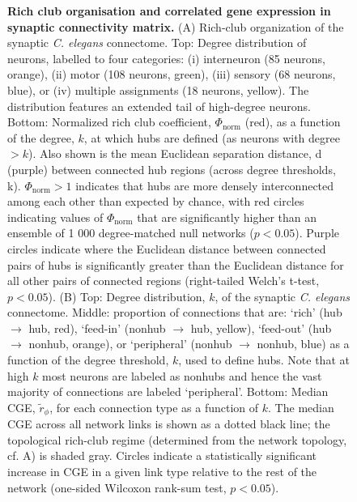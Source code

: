 \begin{figure}[h!]
 \caption{{\bf Rich club organisation and correlated gene expression in synaptic connectivity matrix.}
(A) Rich-club organization of the synaptic \textit{C. elegans} connectome.
Top: Degree distribution of neurons, labelled to four categories: (i) interneuron (85 neurons, orange), (ii) motor (108 neurons, green), (iii) sensory (68 neurons, blue), or (iv) multiple assignments (18 neurons, yellow).
The distribution features an extended tail of high-degree neurons. Bottom: Normalized rich club coefficient, $\Phi_\mathrm{norm}$ (red), as a function of the degree, $k$, at which hubs are defined (as neurons with degree $>k$).
Also shown is the mean Euclidean separation distance, d (purple) between connected hub regions (across degree thresholds, k). $\Phi_\mathrm{norm} > 1$ indicates that hubs are more densely interconnected among each other than expected by chance, with red circles indicating values of $\Phi_\mathrm{norm}$ that are significantly higher than an ensemble of 1 000 degree-matched null networks ($p < 0.05$).
Purple circles indicate where the Euclidean distance between connected pairs of hubs is significantly greater than the Euclidean distance for all other pairs of connected regions (right-tailed Welch's t-test, $p < 0.05$).
(B) Top: Degree distribution, $k$, of the synaptic \textit{C. elegans}  connectome.
Middle: proportion of connections that are: `rich' (hub $\rightarrow$ hub, red), `feed-in' (nonhub $\rightarrow$ hub, yellow), `feed-out' (hub $\rightarrow$ nonhub, orange), or `peripheral' (nonhub $\rightarrow$ nonhub, blue) as a function of the degree threshold, $k$, used to define hubs.
Note that at high $k$ most neurons are labeled as nonhubs and hence the vast majority of connections are labeled `peripheral'.
Bottom: Median CGE, $\tilde{r}_\phi$, for each connection type as a function of $k$.
The median CGE across all network links is shown as a dotted black line; the topological rich-club regime (determined from the network topology, cf. A) is shaded gray.
Circles indicate a statistically significant increase in CGE in a given link type relative to the rest of the network (one-sided Wilcoxon rank-sum test, $p < 0.05$).}

\label{fig:Ch2S1_Fig}
\end{figure}

